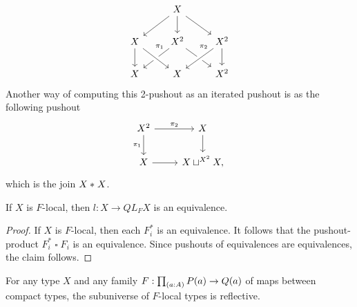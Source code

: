 \begin{eg}
\begin{equation*}
\begin{tikzcd}
& X \arrow[dl] \arrow[d] \arrow[dr] \\
X \arrow[d] & X^2 \arrow[dl,swap,"\pi_1" very near start] \arrow[dr] & X^2 \arrow[dl,crossing over,swap,"\pi_2" very near start] \arrow[d] \\
X & X \arrow[from=ul,crossing over] & X^2
\end{tikzcd}
\end{equation*}
Another way of computing this 2-pushout as an iterated pushout is as the following pushout
\begin{equation*}
\begin{tikzcd}
X^2 \arrow[r,"\pi_2"] \arrow[d,swap,"\pi_1"] & X \arrow[d] \\
X \arrow[r] & X\sqcup^{X^2} X,
\end{tikzcd}
\end{equation*}
which is the join ${X}\ast_{}{X}$.
\end{eg}

\begin{prp}
If $X$ is $F$-local, then $l:X\to QL_F X$ is an equivalence.
\end{prp}

\begin{proof}
If $X$ is $F$-local, then each $F_i^\ast$ is an equivalence. It follows that the pushout-product $F_i^\ast\mathbin{\square} F_i$ is an equivalence. Since pushouts of equivalences are equivalences, the claim follows.
\end{proof}

\begin{thm}\label{thm:localization}
For any type $X$ and any family $F:\prd{a:A}P(a)\to Q(a)$ of maps between
compact types, the subuniverse of $F$-local types is reflective.
\end{thm}

